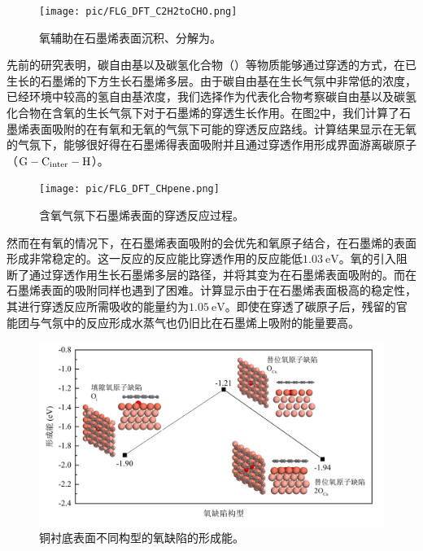 \begin{figure}[htb]
    \texttt{[image: pic/FLG\_DFT\_C2H2toCHO.png]}
    \caption{氧辅助在石墨烯表面沉积、分解为。}
    \label{fig:FLG_DFT_C2H2toCHO}
\end{figure}

先前的研究表明，碳自由基以及碳氢化合物（）等物质能够通过穿透的方式，在已生长的石墨烯的下方生长石墨烯多层。由于碳自由基在生长气氛中非常低的浓度，已经环境中较高的氢自由基浓度，我们选择作为代表化合物考察碳自由基以及碳氢化合物在含氧的生长气氛下对于石墨烯的穿透生长作用。在图\ref{fig:FLG_DFT_CHpene}中，我们计算了石墨烯表面吸附的在有氧和无氧的气氛下可能的穿透反应路线。计算结果显示在无氧的气氛下，能够很好得在石墨烯得表面吸附并且通过穿透作用形成界面游离碳原子（$\rm G-C_{inter}-H$）。

\begin{figure}[htb]
    \texttt{[image: pic/FLG\_DFT\_CHpene.png]}
    \caption{含氧气氛下石墨烯表面的穿透反应过程。}
    \label{fig:FLG_DFT_CHpene}
\end{figure}

然而在有氧的情况下，在石墨烯表面吸附的会优先和氧原子结合，在石墨烯的表面形成非常稳定的。这一反应的反应能比穿透作用的反应能低$\SI{1.03}{\electronvolt}$。氧的引入阻断了通过穿透作用生长石墨烯多层的路径，并将其变为在石墨烯表面吸附的。而在石墨烯表面的吸附同样也遇到了困难。计算显示由于在石墨烯表面极高的稳定性，其进行穿透反应所需吸收的能量约为$\SI{1.05}{\electronvolt}$。即使在穿透了碳原子后，残留的官能团与气氛中的反应形成水蒸气也仍旧比在石墨烯上吸附的能量要高。

\begin{figure}[htb]
    \includegraphics{pic/FLG_DFT_Odefect.png}
    \caption{铜衬底表面不同构型的氧缺陷的形成能。}
    \label{fig:FLG_DFT_Odefect}
\end{figure}

